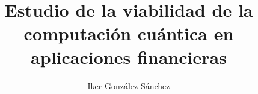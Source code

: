 \documentclass[epsbased,copyright,final,printable,covers,extendedindex,firstnumbered,tfg,gnuplot]{tfgtfmthesisuam}
\title{Estudio de la viabilidad de la computación cuántica en aplicaciones financieras}
\subtitle{}
\author{Iker González Sánchez}
\begin{document}








\nocite{egginger2024qkernels,wang2024optionpricing,salasperalta2012diabaticgates,nielsen2010quantumcomputation}

\end{document}
